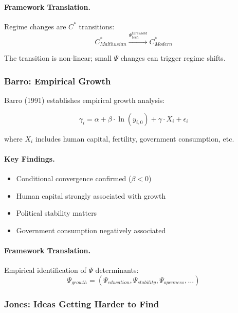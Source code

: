 \paragraph{Framework Translation.}
Regime changes are $C^*$ transitions:
\begin{equation}
C^*_{Malthusian} \xrightarrow{\Psi_{tech}^{threshold}} C^*_{Modern}
\end{equation}

The transition is non-linear; small $\Psi$ changes can trigger regime shifts.

\subsubsection{Barro: Empirical Growth}

Barro (1991) establishes empirical growth analysis:

\begin{equation}
\gamma_i = \alpha + \beta \cdot \ln(y_{i,0}) + \gamma \cdot X_i + \epsilon_i
\end{equation}

where $X_i$ includes human capital, fertility, government consumption, etc.

\paragraph{Key Findings.}
\begin{itemize}
    \item Conditional convergence confirmed ($\beta < 0$)
    \item Human capital strongly associated with growth
    \item Political stability matters
    \item Government consumption negatively associated
\end{itemize}

\paragraph{Framework Translation.}
Empirical identification of $\Psi$ determinants:
\begin{equation}
\Psi_{growth} = (\Psi_{education}, \Psi_{stability}, \Psi_{openness}, \ldots)
\end{equation}

\subsubsection{Jones: Ideas Getting Harder to Find}

